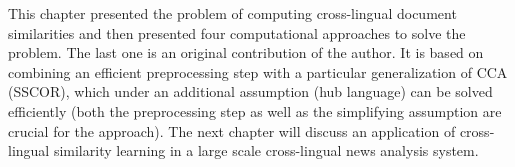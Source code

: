 \vspace{5mm}
This chapter presented the problem of computing cross-lingual document similarities and then presented four computational
approaches to solve the problem. The last one is an original contribution of the author. It is based on combining an efficient
preprocessing step with a particular generalization of CCA (SSCOR), which under an additional assumption (hub language) can
be solved efficiently (both the preprocessing step as well as the simplifying assumption are crucial for the approach). The
next chapter will discuss an application of  cross-lingual similarity learning in a large scale cross-lingual news analysis system. 